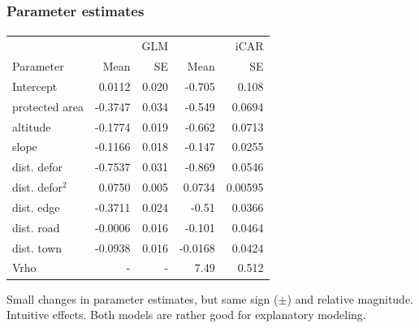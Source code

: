 \documentclass[slidetop,10pt,dvipsnames,leqno,fleqn]{beamer} %
\begin{document}
\begin{frame}
  \frametitle{Parameter estimates}
  \framesubtitle{}

  \begin{center}
    {\small
      \begin{tabular}{@{}lrrrr@{}}
        \toprule
        ~               & ~       & GLM   & ~       & iCAR    \\
        Parameter       & Mean    & SE    & Mean    & SE      \\
        \midrule
        Intercept       & 0.0112  & 0.020 & -0.705  & 0.108   \\
        protected area  & -0.3747 & 0.034 & -0.549  & 0.0694  \\
        altitude        & -0.1774 & 0.019 & -0.662  & 0.0713  \\
        slope           & -0.1166 & 0.018 & -0.147  & 0.0255  \\
        dist. defor     & -0.7537 & 0.031 & -0.869  & 0.0546  \\
        dist. defor$^2$ & 0.0750  & 0.005 & 0.0734  & 0.00595 \\
        dist. edge      & -0.3711 & 0.024 & -0.51   & 0.0366  \\
        dist. road      & -0.0006 & 0.016 & -0.101  & 0.0464  \\
        dist. town      & -0.0938 & 0.016 & -0.0168 & 0.0424  \\
        Vrho            & -       & -     & 7.49    & 0.512   \\
        \bottomrule
      \end{tabular}
    }
  \end{center}
  Small changes in parameter estimates, but same sign ($\pm$) and relative magnitude.\\
  Intuitive effects. Both models are rather good for explanatory modeling.
\end{frame}
\end{document}
